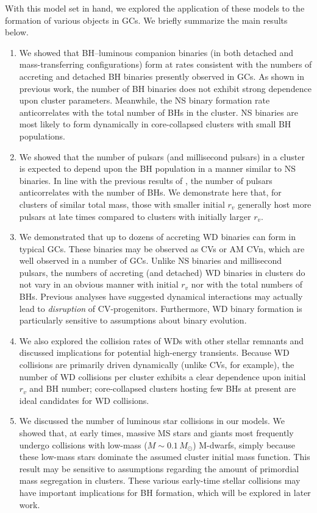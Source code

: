 \documentclass[twocolumn,tighten]{aastex63}
\begin{document}
With this model set in hand, we explored the application of these models to the formation of various objects in GCs. We briefly summarize the main results below.

\begin{enumerate}
\item We showed that BH--luminous companion binaries (in both detached and mass-transferring configurations) form at rates consistent with the numbers of accreting and detached BH binaries presently observed in GCs. As shown in previous work, the number of BH binaries does not exhibit strong dependence upon cluster parameters. Meanwhile, the NS binary formation rate anticorrelates with the total number of BHs in the cluster. NS binaries are most likely to form dynamically in core-collapsed clusters with small BH populations.

\item We showed that the number of pulsars (and millisecond pulsars) in a cluster is expected to depend upon the BH population in a manner similar to NS binaries. In line with the previous results of \citet{Ye2018}, the number of pulsars anticorrelates with the number of BHs. We demonstrate here that, for clusters of similar total mass, those with smaller initial $r_v$ generally host more pulsars at late times compared to clusters with initially larger $r_v$.

\item We demonstrated that up to dozens of accreting WD binaries can form in typical GCs. These binaries may be observed as CVs or AM CVn, which are well observed in a number of GCs. Unlike NS binaries and millisecond pulsars, the numbers of accreting (and detached) WD binaries in clusters do not vary in an obvious manner with initial $r_v$ nor with the total numbers of BHs. Previous analyses have suggested dynamical interactions may actually lead to \textit{disruption} of CV-progenitors. Furthermore, WD binary formation is particularly sensitive to assumptions about binary evolution. 

\item We also explored the collision rates of WDs with other stellar remnants and discussed implications for potential high-energy transients. Because WD collisions are primarily driven dynamically (unlike CVs, for example), the number of WD collisions per cluster exhibits a clear dependence upon initial $r_v$ and BH number; core-collapsed clusters hosting few BHs at present are ideal candidates for WD collisions.

\item We discussed the number of luminous star collisions in our models. We showed that, at early times, massive MS stars and giants most frequently undergo collisions with low-mass ($M\sim0.1\,M_{\odot}$) M-dwarfs, simply because these low-mass stars dominate the assumed cluster initial mass function. This result may be sensitive to assumptions regarding the amount of primordial mass segregation in clusters. These various early-time stellar collisions may have important implications for BH formation, which will be explored in later work.


\end{enumerate}
\end{document}
